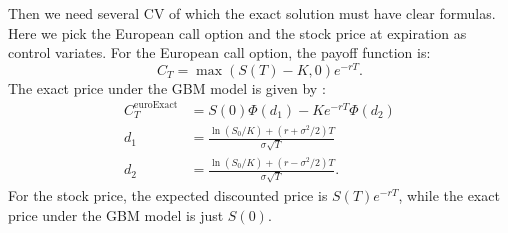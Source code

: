 Then we need several CV of which the exact solution must have clear formulas. 
Here we pick the European call option and the stock price at expiration as control variates.   
For the European call option, the payoff function is: 
\[ C_{T} = \max (S(T)-K,0)e^{-rT}.\] 
The exact price under the GBM model is given by \cite{boyle1977options}:  
\begin{align*}
    C_{T}^{\mathrm{euroExact}} &= S(0)\Phi(d_1)-Ke^{-rT}\Phi(d_2)\\
    d_1 &=\frac{\ln(S_0/K)+(r+\sigma^2/2)T}{\sigma\sqrt{T}}\\
    d_2 &=\frac{\ln(S_0/K)+(r-\sigma^2/2)T}{\sigma\sqrt{T}}.
\end{align*}
For the stock price, the expected discounted price is $S(T)e^{-rT}$, while the exact price under the GBM model is just $S(0)$.  

